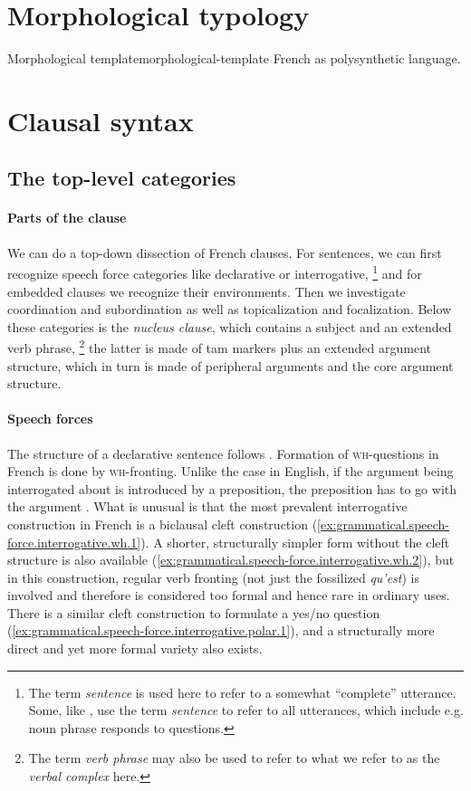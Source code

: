 \documentclass[a4paper, oneside, 12pt]{report}
\newcommand*{\citepage}[1]{p.~{#1}}
\newcommand*{\term}[1]{\emph{#1}}
\newcommand{\form}[1]{\emph{#1}}
\newcommand*{\category}[1]{\textsc{#1}}
\begin{document}
\section{Morphological typology}

\begin{todobox}{Morphological template}{morphological-template}
    French as polysynthetic language.
\end{todobox}

\section{Clausal syntax}

\subsection{The top-level categories}

\paragraph*{Parts of the clause}
We can do a top-down dissection of French clauses.
For sentences, we can first recognize speech force categories like declarative or interrogative,%
\footnote{
    The term \term{sentence} is used here to refer to a somewhat ``complete'' utterance.
    Some, like \citet{cgel}, use the term \term{sentence} to refer to all utterances,
    which include e.g. noun phrase responds to questions.
}
and for embedded clauses we recognize their environments.
Then we investigate coordination and subordination
as well as topicalization and focalization.
Below these categories is the \term{nucleus clause},
which contains a subject and an extended verb phrase,%
\footnote{
    The term \term{verb phrase} may also be used to refer to what we refer to as the \term{verbal complex} here.
}
the latter is made of \ac{tam} markers plus an extended argument structure,
which in turn is made of peripheral arguments and the core argument structure.

\paragraph*{Speech forces}
The structure of a declarative sentence follows .
Formation of \category{wh}-questions in French is done by \category{wh}-fronting.
Unlike the case in English, if the argument being interrogated about is introduced by a preposition,
the preposition has to go with the argument \citep[\citepage{60}]{rowlett2007syntax}.
What is unusual is that the most prevalent interrogative construction in French is a biclausal cleft construction
(\ref{ex:grammatical.speech-force.interrogative.wh.1}).
A shorter, structurally simpler form without the cleft structure is also available (\ref{ex:grammatical.speech-force.interrogative.wh.2}),
but in this construction, regular verb fronting (not just the fossilized \form{qu'est}) is involved
and therefore is considered too formal and hence rare in ordinary uses.
There is a similar cleft construction to formulate a yes/no question
(\ref{ex:grammatical.speech-force.interrogative.polar.1}),
and a structurally more direct and yet more formal variety also exists.
\end{document}
